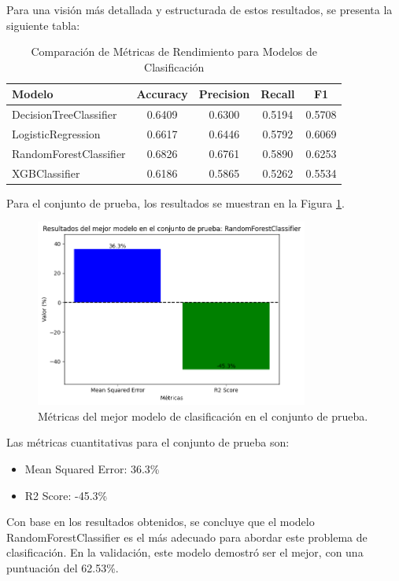 Para una visión más detallada y estructurada de estos resultados, se presenta la siguiente tabla:

\begin{table}[H]
    \centering
    \caption{Comparación de Métricas de Rendimiento para Modelos de Clasificación}
    \begin{tabular}{lcccc}
        \toprule
        \textbf{Modelo} & \textbf{Accuracy} & \textbf{Precision} & \textbf{Recall} & \textbf{F1} \\
        \midrule
        DecisionTreeClassifier & 0.6409 & 0.6300 & 0.5194 & 0.5708 \\
        LogisticRegression & 0.6617 & 0.6446 & 0.5792 & 0.6069 \\
        RandomForestClassifier & 0.6826 & 0.6761 & 0.5890 & 0.6253 \\
        XGBClassifier & 0.6186 & 0.5865 & 0.5262 & 0.5534 \\
        \bottomrule
    \end{tabular}
    \label{tab:performance_metrics}
\end{table}

Para el conjunto de prueba, los resultados se muestran en la Figura \ref{fig:metricas_clasificacion_bestModel}.

\begin{figure}[H]
    \centering
    \includegraphics[width=0.8\textwidth]{img/compara_algoritmos/metricasBestModelRandomForesClassifier.png}
    \caption{Métricas del mejor modelo de clasificación en el conjunto de prueba.}
    \label{fig:metricas_clasificacion_bestModel}
\end{figure}

Las métricas cuantitativas para el conjunto de prueba son:

\begin{itemize}
    \item Mean Squared Error: 36.3\%
    \item R2 Score: -45.3\%
\end{itemize}

Con base en los resultados obtenidos, se concluye que el modelo RandomForestClassifier es el más adecuado para abordar este problema de clasificación. En la validación, este modelo demostró ser el mejor, con una puntuación del 62.53\%.